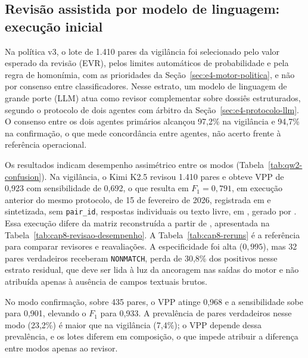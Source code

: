 \subsection{Revisão assistida por modelo de linguagem: execução inicial}\label{sec:e4-llm-inicial}

Na política v3, o lote de 1.410 pares da vigilância foi selecionado pelo valor esperado da revisão (EVR), pelos limites automáticos de probabilidade e pela regra de homonímia, com as prioridades da Seção~\ref{sec:e4-motor-politica}, e não por consenso entre classificadores. Nesse estrato, um modelo de linguagem de grande porte (LLM) atua como revisor complementar sobre dossiês estruturados, segundo o protocolo de dois agentes com árbitro da Seção~\ref{sec:e4-protocolo-llm}. O consenso entre os dois agentes primários alcançou 97{,}2\% na vigilância e 94{,}7\% na confirmação, o que mede concordância entre agentes, não acerto frente à referência operacional.



Os resultados indicam desempenho assimétrico entre os modos (Tabela~\ref{tab:qw2-confusion}). Na vigilância, o Kimi K2.5 revisou 1.410 pares e obteve VPP de 0{,}923 com sensibilidade de 0{,}692, o que resulta em $F_1 = 0{,}791$, em execução anterior do mesmo protocolo, de 15 de fevereiro de 2026, registrada em  e sintetizada, sem \texttt{pair\_id}, respostas individuais ou texto livre, em , gerado por . Essa execução difere da matriz reconstruída a partir de , apresentada na Tabela~\ref{tab:cap8-revisao-desempenho}. A Tabela~\ref{tab:cap8-reruns} é a referência para comparar revisores e reavaliações. A especificidade foi alta ($0{,}995$), mas 32 pares verdadeiros receberam \texttt{NONMATCH}, perda de 30{,}8\% dos positivos nesse estrato residual, que deve ser lida à luz da ancoragem nas saídas do motor e não atribuída apenas à ausência de campos textuais brutos.

No modo confirmação, sobre 435 pares, o VPP atinge 0{,}968 e a sensibilidade sobe para 0{,}901, elevando o $F_1$ para 0{,}933. A prevalência de pares verdadeiros nesse modo (23{,}2\%) é maior que na vigilância (7{,}4\%); o VPP depende dessa prevalência, e os lotes diferem em composição, o que impede atribuir a diferença entre modos apenas ao revisor.



